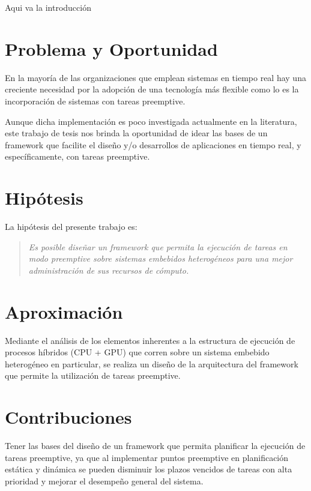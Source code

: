 


Aqui va la introducción

\section{Problema y Oportunidad}
En la mayoría de las organizaciones que emplean sistemas en tiempo real hay una creciente necesidad por la adopción de una tecnología más flexible como lo es la incorporación de sistemas con tareas preemptive.

Aunque dicha implementación es poco investigada actualmente en la literatura, este trabajo de tesis nos brinda la oportunidad de idear las bases de un framework que facilite el diseño y/o desarrollos de aplicaciones en tiempo real, y específicamente, con tareas preemptive.

\section{Hipótesis}
La hipótesis del presente trabajo es:

\begin{quote}
\textit{Es posible diseñar un framework que permita la ejecución de tareas en modo preemptive sobre sistemas embebidos heterogéneos para una mejor administración de sus recursos de cómputo.}
\end{quote}

\section{Aproximación}

Mediante el análisis de los elementos inherentes a la estructura de ejecución de procesos híbridos (CPU + GPU) que corren sobre un sistema embebido heterogéneo en particular, se realiza un diseño de la arquitectura del framework que permite la utilización de tareas preemptive.

\section{Contribuciones}
Tener las bases del diseño de un framework que permita planificar la ejecución de tareas preemptive, ya que al implementar puntos preemptive en planificación estática y dinámica se pueden disminuir los plazos vencidos de tareas con alta prioridad y mejorar el desempeño general del sistema.

